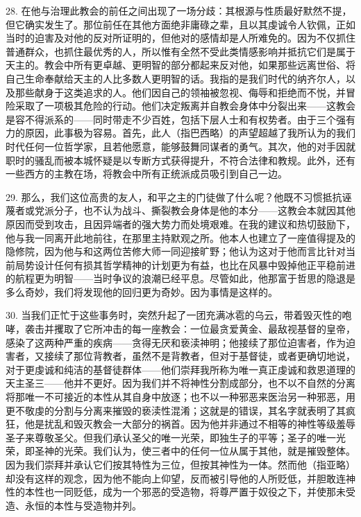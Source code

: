 28. 在他与治理此教会的前任之间出现了一场分歧：其根源与性质最好默然不提，但它确实发生了。那位前任在其他方面绝非庸碌之辈，且以其虔诚令人钦佩，正如当时的迫害及对他的反对所证明的，但他对的感情却是人所难免的。因为不仅抓住普通群众，也抓住最优秀的人，所以惟有全然不受此类情感影响并抵抗它们是属于天主的。教会中所有更卓越、更明智的部分都起来反对他，如果那些远离世俗、将自己生命奉献给天主的人比多数人更明智的话。我指的是我们时代的纳齐尔人，以及那些献身于这类追求的人。他们因自己的领袖被忽视、侮辱和拒绝而不悦，并冒险采取了一项极其危险的行动。他们决定叛离并自教会身体中分裂出来——这教会是容不得派系的——同时带走不少百姓，包括下层人士和有权势者。由于三个强有力的原因，此事极为容易。首先，此人（指巴西略）的声望超越了我所认为的我们时代任何一位哲学家，且若他愿意，能够鼓舞同谋者的勇气。其次，他的对手因就职时的骚乱而被本城怀疑是以专断方式获得提升，不符合法律和教规。此外，还有一些西方的主教在场，将教会中所有正统派成员吸引到自己一边。\par

29. 那么，我们这位高贵的友人，和平之主的门徒做了什么呢？他既不习惯抵抗诬蔑者或党派分子，也不认为战斗、撕裂教会身体是他的本分——这教会本就因其他原因而受到攻击，且因异端者的强大势力而处境艰难。在我的建议和热切鼓励下，他与我一同离开此地前往，在那里主持默观之所。他本人也建立了一座值得提及的隐修院，因为他与和这两位苦修大师一同迎接旷野；他认为这对于他而言比针对当前局势设计任何有损其哲学精神的计划更为有益，也比在风暴中毁掉他正平稳前进的航程更为明智——当时争议的浪潮已经平息。尽管如此，他那富于哲思的隐退是多么奇妙，我们将发现他的回归更为奇妙。因为事情是这样的。\par

30. 当我们正忙于这些事务时，突然升起了一团充满冰雹的乌云，带着毁灭性的咆哮，袭击并攫取了它所冲击的每一座教会：一位最贪爱黄金、最敌视基督的皇帝，感染了这两种严重的疾病——贪得无厌和亵渎神明；他接续了那位迫害者，作为迫害者，又接续了那位背教者，虽然不是背教者，但对于基督徒，或者更确切地说，对于更虔诚和纯洁的基督徒群体——他们崇拜我所称为唯一真正虔诚和救恩道理的天主圣三——他并不更好。因为我们并不将神性分割成部分，也不以不自然的分离将那唯一不可接近的本性从其自身中放逐；也不以一种邪恶来医治另一种邪恶，用更不敬虔的分割与分离来摧毁的亵渎性混淆；这就是的错误，其名字就表明了其疯狂，他是扰乱和毁灭教会一大部分的祸首。因为他并非通过不相等的神性等级羞辱圣子来尊敬圣父。但我们承认圣父的唯一光荣，即独生子的平等；圣子的唯一光荣，即圣神的光荣。我们认为，使三者中的任何一位从属于其他，就是摧毁整体。因为我们崇拜并承认它们按其特性为三位，但按其神性为一体。然而他（指亚略）却没有这样的观念，因为他不能向上仰望，反而被引导他的人所贬低，并胆敢连神性的本性也一同贬低，成为一个邪恶的受造物，将尊严置于奴役之下，并使那未受造、永恒的本性与受造物并列。\par

